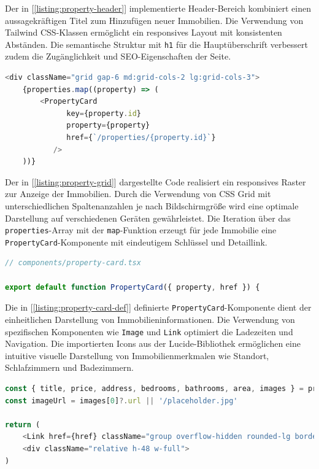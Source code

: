 	
	Der in [\ref{listing:property-header}] implementierte Header-Bereich kombiniert einen aussagekräftigen Titel zum Hinzufügen neuer Immobilien. Die Verwendung von Tailwind CSS-Klassen ermöglicht ein responsives Layout mit konsistenten Abständen. Die semantische Struktur mit \texttt{h1} für die Hauptüberschrift verbessert zudem die Zugänglichkeit und SEO-Eigenschaften der Seite.
	
\begin{lstlisting}[language=JavaScript, caption={Rasterdarstellung der Immobilien.}, label={listing:property-grid}]
<div className="grid gap-6 md:grid-cols-2 lg:grid-cols-3">
	{properties.map((property) => (
		<PropertyCard 
		      key={property.id}
		      property={property}
		      href={`/properties/{property.id}`}
	       />
	))}
\end{lstlisting}

	
	Der in [\ref{listing:property-grid}] dargestellte Code realisiert ein responsives Raster zur Anzeige der Immobilien. Durch die Verwendung von CSS Grid mit unterschiedlichen Spaltenanzahlen je nach Bildschirmgröße wird eine optimale Darstellung auf verschiedenen Geräten gewährleistet. Die Iteration über das \texttt{properties}-Array mit der \texttt{map}-Funktion erzeugt für jede Immobilie eine \texttt{PropertyCard}-Komponente mit eindeutigem Schlüssel und Detaillink.
	
	
\begin{lstlisting}[language=JavaScript, caption={Definition der Immobilienkarten-Komponente.}, label={listing:property-card-def}]
// components/property-card.tsx

export default function PropertyCard({ property, href }) {
\end{lstlisting}

		
		Die in [\ref{listing:property-card-def}] definierte \texttt{PropertyCard}-Komponente dient der einheitlichen Darstellung von Immobilieninformationen. Die Verwendung von spezifischen Komponenten wie \texttt{Image} und \texttt{Link} optimiert die Ladezeiten und Navigation. Die importierten Icons aus der Lucide-Bibliothek ermöglichen eine intuitive visuelle Darstellung von Immobilienmerkmalen wie Standort, Schlafzimmern und Badezimmern.
		
\begin{lstlisting}[language=JavaScript, caption={Datenextraktion und Container-Struktur.}, label={listing:property-card-structure}]
const { title, price, address, bedrooms, bathrooms, area, images } = property
const imageUrl = images[0]?.url || '/placeholder.jpg'

return (
	<Link href={href} className="group overflow-hidden rounded-lg border shadow transition hover:shadow-md">
	<div className="relative h-48 w-full">
)
\end{lstlisting}

